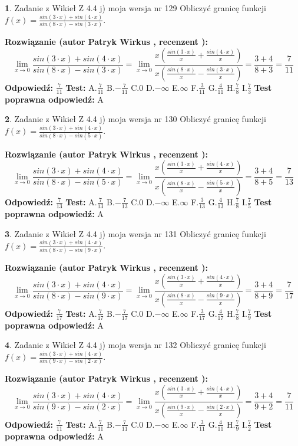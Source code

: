 \documentclass[12pt, a4paper]{article}
\theoremstyle{definition} %
\newtheorem{zad}{}
\newcommand{\zadStart}[1]{\begin{zad}#1\newline}
\newcommand{\zadStop}{\end{zad}}
\newcommand{\rozwStart}[2]{\noindent \textbf{Rozwiązanie (autor #1 , recenzent #2): }\newline}
\newcommand{\rozwStop}{\newline}
\newcommand{\odpStart}{\noindent \textbf{Odpowiedź:}\newline}
\newcommand{\odpStop}{\newline}
\newcommand{\testStart}{\noindent \textbf{Test:}\newline}
\newcommand{\testStop}{\newline}
\newcommand{\kluczStart}{\noindent \textbf{Test poprawna odpowiedź:}\newline}
\newcommand{\kluczStop}{\newline}
\begin{document}
\zadStart{Zadanie z Wikieł Z 4.4 j) moja wersja nr 129}
Obliczyć granicę funkcji $f(x)=\frac{sin(3\cdot x) +sin(4\cdot x)}{sin(8\cdot x) -sin(3\cdot x)}$.
\zadStop
\rozwStart{Patryk Wirkus}{}
$$\lim\limits_{x\to 0}\frac{sin(3\cdot x) +sin(4\cdot x)}{sin(8\cdot x) -sin(3\cdot x)}=\lim\limits_{x\to 0}\frac{x(\frac{sin(3\cdot x)}{x}+\frac{sin(4\cdot x)}{x})}{x(\frac{sin(8\cdot x)}{x}-\frac{sin(3\cdot x)}{x})}=\frac{3+4}{8+3} = \frac{7}{11}$$
\rozwStop
\odpStart
$\frac{7}{11}$
\odpStop
\testStart
A.$\frac{7}{11}$
B.$-\frac{7}{11}$
C.$0$
D.$-\infty$
E.$\infty$
F.$\frac{3}{11}$
G.$\frac{4}{11}$
H.$\frac{7}{8}$
I.$\frac{7}{3}$
\testStop
\kluczStart
A
\kluczStop



\zadStart{Zadanie z Wikieł Z 4.4 j) moja wersja nr 130}
Obliczyć granicę funkcji $f(x)=\frac{sin(3\cdot x) +sin(4\cdot x)}{sin(8\cdot x) -sin(5\cdot x)}$.
\zadStop
\rozwStart{Patryk Wirkus}{}
$$\lim\limits_{x\to 0}\frac{sin(3\cdot x) +sin(4\cdot x)}{sin(8\cdot x) -sin(5\cdot x)}=\lim\limits_{x\to 0}\frac{x(\frac{sin(3\cdot x)}{x}+\frac{sin(4\cdot x)}{x})}{x(\frac{sin(8\cdot x)}{x}-\frac{sin(5\cdot x)}{x})}=\frac{3+4}{8+5} = \frac{7}{13}$$
\rozwStop
\odpStart
$\frac{7}{13}$
\odpStop
\testStart
A.$\frac{7}{13}$
B.$-\frac{7}{13}$
C.$0$
D.$-\infty$
E.$\infty$
F.$\frac{3}{13}$
G.$\frac{4}{13}$
H.$\frac{7}{8}$
I.$\frac{7}{5}$
\testStop
\kluczStart
A
\kluczStop



\zadStart{Zadanie z Wikieł Z 4.4 j) moja wersja nr 131}
Obliczyć granicę funkcji $f(x)=\frac{sin(3\cdot x) +sin(4\cdot x)}{sin(8\cdot x) -sin(9\cdot x)}$.
\zadStop
\rozwStart{Patryk Wirkus}{}
$$\lim\limits_{x\to 0}\frac{sin(3\cdot x) +sin(4\cdot x)}{sin(8\cdot x) -sin(9\cdot x)}=\lim\limits_{x\to 0}\frac{x(\frac{sin(3\cdot x)}{x}+\frac{sin(4\cdot x)}{x})}{x(\frac{sin(8\cdot x)}{x}-\frac{sin(9\cdot x)}{x})}=\frac{3+4}{8+9} = \frac{7}{17}$$
\rozwStop
\odpStart
$\frac{7}{17}$
\odpStop
\testStart
A.$\frac{7}{17}$
B.$-\frac{7}{17}$
C.$0$
D.$-\infty$
E.$\infty$
F.$\frac{3}{17}$
G.$\frac{4}{17}$
H.$\frac{7}{8}$
I.$\frac{7}{9}$
\testStop
\kluczStart
A
\kluczStop



\zadStart{Zadanie z Wikieł Z 4.4 j) moja wersja nr 132}
Obliczyć granicę funkcji $f(x)=\frac{sin(3\cdot x) +sin(4\cdot x)}{sin(9\cdot x) -sin(2\cdot x)}$.
\zadStop
\rozwStart{Patryk Wirkus}{}
$$\lim\limits_{x\to 0}\frac{sin(3\cdot x) +sin(4\cdot x)}{sin(9\cdot x) -sin(2\cdot x)}=\lim\limits_{x\to 0}\frac{x(\frac{sin(3\cdot x)}{x}+\frac{sin(4\cdot x)}{x})}{x(\frac{sin(9\cdot x)}{x}-\frac{sin(2\cdot x)}{x})}=\frac{3+4}{9+2} = \frac{7}{11}$$
\rozwStop
\odpStart
$\frac{7}{11}$
\odpStop
\testStart
A.$\frac{7}{11}$
B.$-\frac{7}{11}$
C.$0$
D.$-\infty$
E.$\infty$
F.$\frac{3}{11}$
G.$\frac{4}{11}$
H.$\frac{7}{9}$
I.$\frac{7}{2}$
\testStop
\kluczStart
A
\kluczStop
\end{document}
